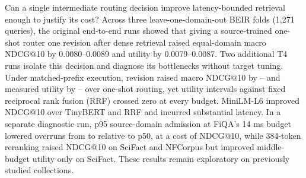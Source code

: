 Can a single intermediate routing decision improve latency-bounded retrieval enough to justify its cost? Across three leave-one-domain-out BEIR folds (1,271 queries), the original end-to-end runs showed that giving a source-trained one-shot router one revision after dense retrieval raised equal-domain macro NDCG@10 by 0.0080--0.0089 and utility by 0.0079--0.0087. Two additional T4 runs isolate this decision and diagnose its bottlenecks without target tuning. Under matched-prefix execution, revision raised macro NDCG@10 by \MatchedNTight{}--\MatchedNMiddle{} and measured utility by \MatchedUTight{}--\MatchedUMiddle{} over one-shot routing, yet utility intervals against fixed reciprocal rank fusion (RRF) crossed zero at every budget. MiniLM-L6 improved NDCG@10 over TinyBERT and RRF and incurred substantial latency. In a separate diagnostic run, p95 source-domain admission at FiQA's 14 ms budget lowered overruns from \MedianRate{} to \TailRate{} relative to p50, at a cost of \TailLoss{} NDCG@10, while 384-token reranking raised NDCG@10 on SciFact and NFCorpus but improved middle-budget utility only on SciFact. These results remain exploratory on previously studied collections.
